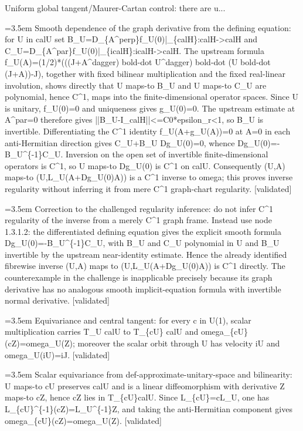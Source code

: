 \documentclass{article}
\newcommand{\step}[1]{\par\noindent\hangindent=3.5em\hangafter=1%
  \makebox[3.5em][l]{\textbf{#1.}}}
\newcommand{\steptag}[1]{\hfill{\small\textsf{[#1]}}}
\begin{document}
\begin{proofbox}{Uniform global tangent/Maurer-Cartan control: there are u...}
\step{1.3.1.2} Smooth dependence of the graph derivative from the defining equation: for U in calU set B\_U=D\_\{A\textasciicircum{}perp\}f\_U(0)|\_\{calH\}:calH->calH and C\_U=D\_\{A\textasciicircum{}par\}f\_U(0)|\_\{icalH\}:icalH->calH. The upstream formula f\_U(A)=(1/2)*(((J+A\textasciicircum{}dagger) bold-dot U\textasciicircum{}dagger) bold-dot (U bold-dot (J+A))-J), together with fixed bilinear multiplication and the fixed real-linear involution, shows directly that U maps-to B\_U and U maps-to C\_U are polynomial, hence C\textasciicircum{}1, maps into the finite-dimensional operator spaces. Since U is unitary, f\_U(0)=0 and uniqueness gives g\_U(0)=0. The upstream estimate at A\textasciicircum{}par=0 therefore gives ||B\_U-I\_calH||<=C0*epsilon\_r<1, so B\_U is invertible. Differentiating the C\textasciicircum{}1 identity f\_U(A+g\_U(A))=0 at A=0 in each anti-Hermitian direction gives C\_U+B\_U Dg\_U(0)=0, whence Dg\_U(0)=-B\_U\textasciicircum{}\{-1\}C\_U. Inversion on the open set of invertible finite-dimensional operators is C\textasciicircum{}1, so U maps-to Dg\_U(0) is C\textasciicircum{}1 on calU. Consequently (U,A) maps-to (U,L\_U(A+Dg\_U(0)A)) is a C\textasciicircum{}1 inverse to omega; this proves inverse regularity without inferring it from mere C\textasciicircum{}1 graph-chart regularity. \steptag{validated} \\[4pt]
\step{1.3.1.3} Correction to the challenged regularity inference: do not infer C\textasciicircum{}1 regularity of the inverse from a merely C\textasciicircum{}1 graph frame. Instead use node 1.3.1.2: the differentiated defining equation gives the explicit smooth formula Dg\_U(0)=-B\_U\textasciicircum{}\{-1\}C\_U, with B\_U and C\_U polynomial in U and B\_U invertible by the upstream near-identity estimate. Hence the already identified fibrewise inverse (U,A) maps to (U,L\_U(A+Dg\_U(0)A)) is C\textasciicircum{}1 directly. The counterexample in the challenge is inapplicable precisely because its graph derivative has no analogous smooth implicit-equation formula with invertible normal derivative. \steptag{validated} \\[4pt]
\step{1.4} Equivariance and central tangent: for every c in U(1), scalar multiplication carries T\_U calU to T\_\{cU\} calU and omega\_\{cU\}(cZ)=omega\_U(Z); moreover the scalar orbit through U has velocity iU and omega\_U(iU)=iJ. \steptag{validated} \\[6pt]
\step{1.4.1} Scalar equivariance from def-approximate-unitary-space and bilinearity: U maps-to cU preserves calU and is a linear diffeomorphism with derivative Z maps-to cZ, hence cZ lies in T\_\{cU\}calU. Since L\_\{cU\}=cL\_U, one has L\_\{cU\}\textasciicircum{}\{-1\}(cZ)=L\_U\textasciicircum{}\{-1\}Z, and taking the anti-Hermitian component gives omega\_\{cU\}(cZ)=omega\_U(Z). \steptag{validated} \\[4pt]

\end{proofbox}
\end{document}
